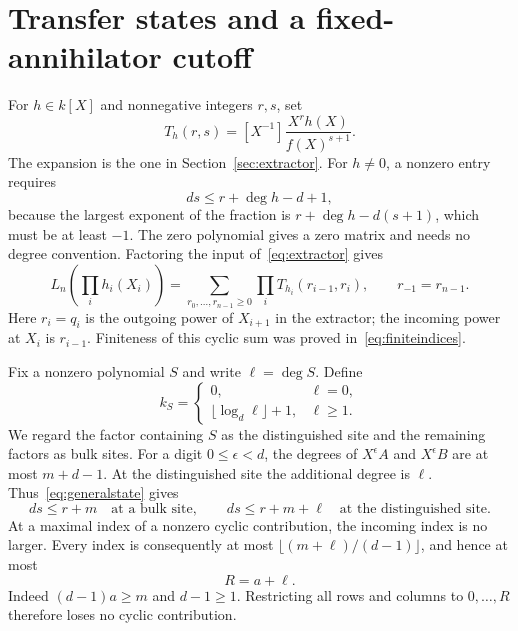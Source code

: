 \section{Transfer states and a fixed-annihilator cutoff}\label{sec:transfer}

For $h\in k[X]$ and nonnegative integers $r,s$, set
\begin{equation}\label{eq:transfer}
 T_h(r,s)=[X^{-1}]\frac{X^r h(X)}{f(X)^{s+1}}.
\end{equation}
The expansion is the one in Section~\ref{sec:extractor}. For
$h\ne0$, a nonzero entry requires
\begin{equation}\label{eq:generalstate}
 ds\le r+\deg h-d+1,
\end{equation}
because the largest exponent of the fraction is
$r+\deg h-d(s+1)$, which must be at least $-1$. The zero
polynomial gives a zero matrix and needs no degree convention.
Factoring the input of~\eqref{eq:extractor} gives
\begin{equation}\label{eq:cyclicsum}
 L_n\left(\prod_i h_i(X_i)\right)=
 \sum_{r_0,\ldots,r_{n-1}\ge0}
        \prod_iT_{h_i}(r_{i-1},r_i),\qquad r_{-1}=r_{n-1}.
\end{equation}
Here $r_i=q_i$ is the outgoing power of $X_{i+1}$ in the
extractor; the incoming power at $X_i$ is $r_{i-1}$. Finiteness
of this cyclic sum was proved in~\eqref{eq:finiteindices}.

Fix a nonzero polynomial $S$ and write $\ell=\deg S$. Define
\begin{equation}\label{eq:ks}
 k_S=\begin{cases}
       0,&\ell=0,\\
       \lfloor\log_d\ell\rfloor+1,&\ell\ge1.
      \end{cases}
\end{equation}
We regard the factor containing $S$ as the distinguished site and
the remaining factors as bulk sites. For a digit $0\le\epsilon<d$,
the degrees of $X^\epsilon A$ and $X^\epsilon B$ are at most
$m+d-1$. At the distinguished site the additional degree is
$\ell$. Thus~\eqref{eq:generalstate} gives
\begin{equation}\label{eq:statebounds}
 ds\le r+m\quad\text{at a bulk site},\qquad
 ds\le r+m+\ell\quad\text{at the distinguished site}.
\end{equation}
At a maximal index of a nonzero cyclic contribution, the incoming
index is no larger. Every index is consequently at most
$\lfloor(m+\ell)/(d-1)\rfloor$, and hence at most
\begin{equation}\label{eq:R}
 R=a+\ell.
\end{equation}
Indeed $(d-1)a\ge m$ and $d-1\ge1$. Restricting all rows and
columns to $0,\ldots,R$ therefore loses no cyclic contribution.

